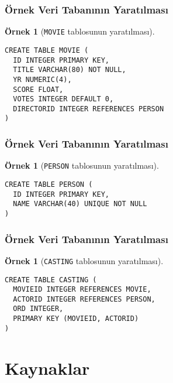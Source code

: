 \documentclass[dvipsnames]{beamer}
\theoremstyle{definition}
\theoremstyle{example}
\newtheorem{ornek}[theorem]{Örnek}
\theoremstyle{plain}
\begin{document}
\begin{frame}[fragile]
  \frametitle{Örnek Veri Tabanının Yaratılması}

  \begin{ornek}[\texttt{MOVIE} tablosunun yaratılması]
    \begin{lstlisting}
CREATE TABLE MOVIE (
  ID INTEGER PRIMARY KEY,
  TITLE VARCHAR(80) NOT NULL,
  YR NUMERIC(4),
  SCORE FLOAT,
  VOTES INTEGER DEFAULT 0,
  DIRECTORID INTEGER REFERENCES PERSON
)
    \end{lstlisting}
  \end{ornek}
\end{frame}

\begin{frame}[fragile]
  \frametitle{Örnek Veri Tabanının Yaratılması}

  \begin{ornek}[\texttt{PERSON} tablosunun yaratılması]
    \begin{lstlisting}
CREATE TABLE PERSON (
  ID INTEGER PRIMARY KEY,
  NAME VARCHAR(40) UNIQUE NOT NULL
)
    \end{lstlisting}
  \end{ornek}
\end{frame}

\begin{frame}[fragile]
  \frametitle{Örnek Veri Tabanının Yaratılması}

  \begin{ornek}[\texttt{CASTING} tablosunun yaratılması]
    \begin{lstlisting}
CREATE TABLE CASTING (
  MOVIEID INTEGER REFERENCES MOVIE,
  ACTORID INTEGER REFERENCES PERSON,
  ORD INTEGER,
  PRIMARY KEY (MOVIEID, ACTORID)
)
    \end{lstlisting}
  \end{ornek}
\end{frame}

\section*{Kaynaklar}
\end{document}
